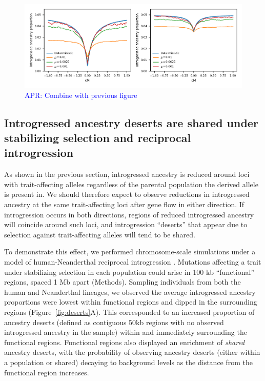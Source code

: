 \documentclass{article}
\newcommand{\aprcomment}[1]{{\textcolor{blue}{APR: #1}}}
\begin{document}
\begin{figure}[t!]
    \centering
    \includegraphics{../figures/linkage_simulation.pdf}
    \caption{
        \textbf{}
        \aprcomment{Combine with previous figure}
    }
    \label{fig:linkage-sim}
\end{figure}

\subsection*{Introgressed ancestry deserts are shared under stabilizing
selection and reciprocal introgression}

As shown in the previous section, introgressed ancestry is reduced around loci
with trait-affecting alleles regardless of the parental population the derived
allele is present in. We should therefore expect to observe reductions in
introgressed ancestry at the same trait-affecting loci after gene flow in
either direction. If introgression occurs in both directions, regions of
reduced introgressed ancestry will coincide around such loci, and introgression
``deserts'' that appear due to selection against trait-affecting alleles will
tend to be shared.

To demonstrate this effect, we performed chromosome-scale simulations under a
model of human-Neanderthal reciprocal introgression
\citep[Figure~\ref{fig:neand-to-human}A,][]{harris2023diverse}. Mutations
affecting a trait under stabilizing selection in each population could arise in
100 kb ``functional'' regions, spaced 1 Mb apart (Methods). Sampling
individuals from both the human and Neanderthal lineages, we observed the
average introgressed ancestry proportions were lowest within functional regions
and dipped in the surrounding regions (Figure~\ref{fig:deserts}A). This
corresponded to an increased proportion of ancestry deserts (defined as
    contiguous 50kb regions with no observed introgressed ancestry in the
sample) within and immediately surrounding the functional regions. Functional
regions also displayed an enrichment of \emph{shared} ancestry deserts, with
the probability of observing ancestry deserts (either within a population or
shared) decaying to background levels as the distance from the functional
region increases.
\end{document}
